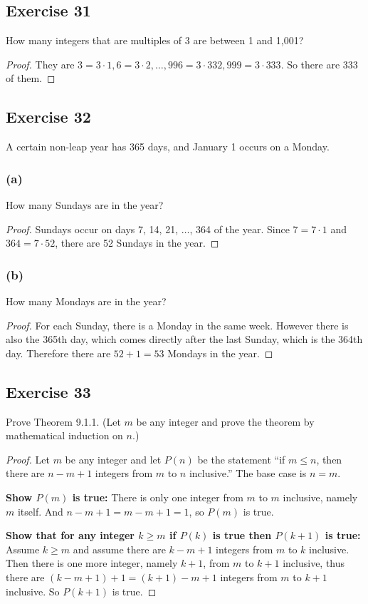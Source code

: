\documentclass[14pt]{extarticle}
\begin{document}
\subsection{Exercise 31}
How many integers that are multiples of 3 are between 1 and 1,001?

\begin{proof}
They are \(3 = 3 \cdot 1, 6 = 3 \cdot 2, \ldots, 996 = 3 \cdot 332, 999 = 3 \cdot 333\). So there are 333 of them.
\end{proof}

\subsection{Exercise 32}
A certain non-leap year has 365 days, and January 1 occurs on a Monday.

\subsubsection{(a)}
How many Sundays are in the year?

\begin{proof}
Sundays occur on days 7, 14, 21, \(\ldots\), 364 of the year. Since \(7 = 7 \cdot 1\) and \(364 = 7 \cdot 52\),
there are 52 Sundays in the year.
\end{proof}

\subsubsection{(b)}
How many Mondays are in the year?

\begin{proof}
For each Sunday, there is a Monday in the same week. However there is also the 365th day, which comes directly
after the last Sunday, which is the 364th day. Therefore there are \(52 + 1 = 53\) Mondays in the year.
\end{proof}

\subsection{Exercise 33}
Prove Theorem 9.1.1. (Let $m$ be any integer and prove the theorem by mathematical induction on $n$.)

\begin{proof}
Let $m$ be any integer and let \(P(n)\) be the statement ``if \(m \leq n\), then there are \(n - m + 1\) integers 
from $m$ to $n$ inclusive.'' The base case is \(n=m\).

{\bf Show $P(m)$ is true:} There is only one integer from $m$ to $m$ inclusive, namely $m$ itself. And \(n - m + 1
 = m - m + 1 = 1\), so $P(m)$ is true.

{\bf Show that for any integer \(k \geq m\) if \(P(k)\) is true then \(P(k+1)\) is true:} Assume \(k \geq m\) and
assume there are \(k-m+1\) integers from $m$ to $k$ inclusive. Then there is one more integer, namely \(k+1\),
from $m$ to $k+1$ inclusive, thus there are \((k-m+1)+1 = (k+1)-m+1\) integers from $m$ to $k+1$ inclusive. So 
\(P(k+1)\) is true.
\end{proof}
\end{document}
